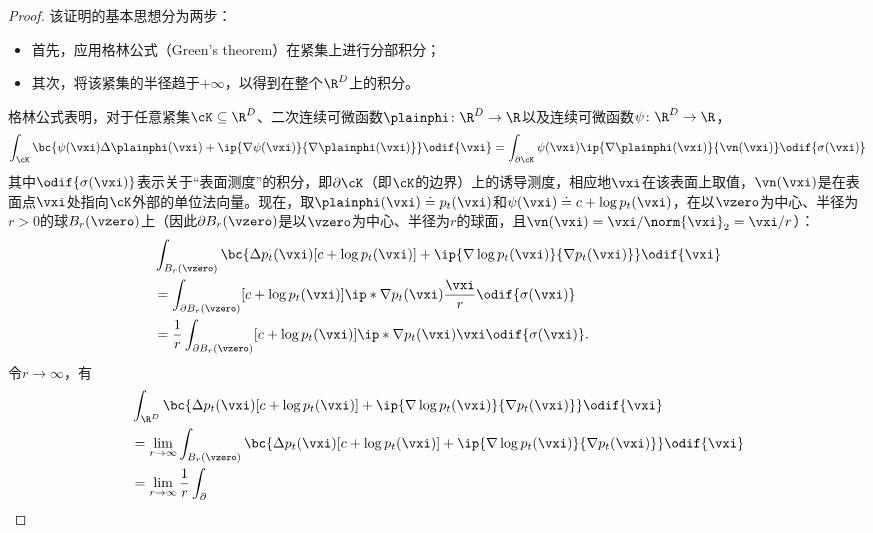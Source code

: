 \documentclass[../../book-main_zh.tex]{subfiles}
\begin{document}
\begin{proof}
    该证明的基本思想分为两步：
    \begin{itemize}
        \item 首先，应用格林公式（Green's theorem）在紧集上进行分部积分；
        \item 其次，将该紧集的半径趋于\(+\infty\)，以得到在整个\(\R^{D}\)上的积分。
    \end{itemize}
    格林公式表明，对于任意紧集\(\cK \subseteq \R^{D}\)、二次连续可微函数\(\plainphi \colon \R^{D} \to \R\)以及连续可微函数\(\psi \colon \R^{D} \to \R\)，
    \begin{equation}
        \int_{\cK}\bc{\psi(\vxi) \Delta \plainphi(\vxi) + \ip{\nabla
        \psi(\vxi)}{\nabla \plainphi(\vxi)}}\odif{\vxi} =
        \int_{\partial \cK}\psi(\vxi)\ip{\nabla
        \plainphi(\vxi)}{\vn(\vxi)}\odif{\sigma(\vxi)}
    \end{equation}
    其中\(\odif{\sigma(\vxi)}\)表示关于“表面测度”的积分，即\(\partial \cK\)（即\(\cK\)的边界）上的诱导测度，相应地\(\vxi\)在该表面上取值，\(\vn(\vxi)\)是在表面点\(\vxi\)处指向\(\cK\)外部的单位法向量。现在，取\(\plainphi(\vxi) \doteq p_{t}(\vxi)\)和\(\psi(\vxi) \doteq c + \log p_{t}(\vxi)\)，在以\(\vzero\)为中心、半径为\(r > 0\)的球\(B_{r}(\vzero)\)上（因此\(\partial B_{r}(\vzero)\)是以\(\vzero\)为中心、半径为\(r\)的球面，且\(\vn(\vxi) = \vxi/\norm{\vxi}_{2} = \vxi/r\)）：
    \begin{align}
        &\int_{B_{r}(\vzero)}\bc{\Delta p_{t}(\vxi)[c + \log
            p_{t}(\vxi)] + \ip{\nabla \log p_{t}(\vxi)}{\nabla
        p_{t}(\vxi)}}\odif{\vxi} \\
        &= \int_{\partial B_{r}(\vzero)}[c + \log
        p_{t}(\vxi)]\ip*{\nabla
        p_{t}(\vxi)}{\frac{\vxi}{r}}\odif{\sigma(\vxi)} \\
        &= \frac{1}{r}\int_{\partial B_{r}(\vzero)}[c + \log
        p_{t}(\vxi)]\ip*{\nabla p_{t}(\vxi)}{\vxi}\odif{\sigma(\vxi)}.
    \end{align}
    令\(r \to \infty\)，有
    \begin{align}
        &\int_{\R^{D}}\bc{\Delta p_{t}(\vxi)[c + \log p_{t}(\vxi)] +
        \ip{\nabla \log p_{t}(\vxi)}{\nabla p_{t}(\vxi)}}\odif{\vxi}
        \label{eq:app_diffusion_r_infinity_limit} \\
        &= \lim_{r \to \infty}\int_{B_{r}(\vzero)}\bc{\Delta
            p_{t}(\vxi)[c + \log p_{t}(\vxi)] + \ip{\nabla \log
        p_{t}(\vxi)}{\nabla p_{t}(\vxi)}}\odif{\vxi} \\
        &= \lim_{r \to \infty}\frac{1}{r}\int_{\partial
}
\end{align}
\end{proof}
\end{document}
